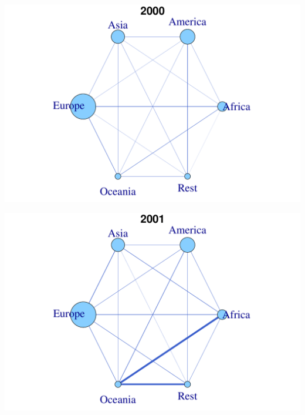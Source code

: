 \documentclass[a4paper,ngerman,oneside,titlepage,bibliography=totoc,11pt]{scrreprt}
\begin{document}
\begin{minipage}[t]{0.48\textwidth}
		\centering
			\includegraphics[width=1\textwidth]{Grafiken/Cont_Ani/cont9.pdf}
\end{minipage}	
\hfill	
\begin{minipage}[t]{0.48\textwidth}	
			\centering
			\includegraphics[width=1\textwidth]{Grafiken/Cont_Ani/cont10.pdf}
\end{minipage}
\end{document}
